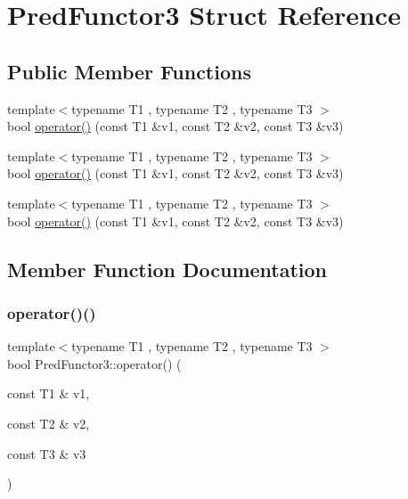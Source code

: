 \hypertarget{struct_pred_functor3}{}\section{Pred\+Functor3 Struct Reference}
\label{struct_pred_functor3}
\subsection*{Public Member Functions}
\begin{DoxyCompactItemize}
\item 
{\footnotesize template$<$typename T1 , typename T2 , typename T3 $>$ }\\bool \mbox{\hyperlink{struct_pred_functor3_a08b0c59189570fb8eb7e2c7452fec995}{operator()}} (const T1 \&v1, const T2 \&v2, const T3 \&v3)
\item 
{\footnotesize template$<$typename T1 , typename T2 , typename T3 $>$ }\\bool \mbox{\hyperlink{struct_pred_functor3_a08b0c59189570fb8eb7e2c7452fec995}{operator()}} (const T1 \&v1, const T2 \&v2, const T3 \&v3)
\item 
{\footnotesize template$<$typename T1 , typename T2 , typename T3 $>$ }\\bool \mbox{\hyperlink{struct_pred_functor3_a08b0c59189570fb8eb7e2c7452fec995}{operator()}} (const T1 \&v1, const T2 \&v2, const T3 \&v3)
\end{DoxyCompactItemize}


\subsection{Member Function Documentation}
\mbox{\label{struct_pred_functor3_a08b0c59189570fb8eb7e2c7452fec995}} 
\subsubsection{\texorpdfstring{operator()()}{operator()()}\hspace{0.1cm}{\footnotesize\ttfamily [1/3]}}
{\footnotesize\ttfamily template$<$typename T1 , typename T2 , typename T3 $>$ \\
bool Pred\+Functor3\+::operator() (\begin{DoxyParamCaption}\item[{const T1 \&}]{v1,  }\item[{const T2 \&}]{v2,  }\item[{const T3 \&}]{v3 }\end{DoxyParamCaption})\hspace{0.3cm}{\ttfamily [inline]}}

